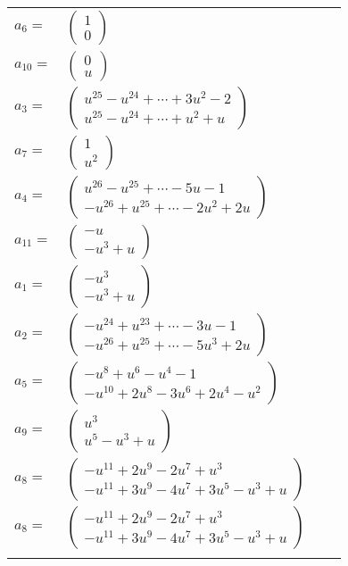\documentclass[1p]{elsarticle_modified}
\theoremstyle{definition}
\begin{document}
\begin{tabular}{m{7pt} m{180pt} m{7pt} m{180pt} }
\flushright $a_{6}=$&$\begin{pmatrix}1\\0\end{pmatrix}$ \\
\flushright $a_{10}=$&$\begin{pmatrix}0\\u\end{pmatrix}$ \\
\flushright $a_{3}=$&$\begin{pmatrix}u^{25}- u^{24}+\cdots+3 u^2-2\\u^{25}- u^{24}+\cdots+u^2+u\end{pmatrix}$ \\
\flushright $a_{7}=$&$\begin{pmatrix}1\\u^2\end{pmatrix}$ \\
\flushright $a_{4}=$&$\begin{pmatrix}u^{26}- u^{25}+\cdots-5 u-1\\- u^{26}+u^{25}+\cdots-2 u^2+2 u\end{pmatrix}$ \\
\flushright $a_{11}=$&$\begin{pmatrix}- u\\- u^3+u\end{pmatrix}$ \\
\flushright $a_{1}=$&$\begin{pmatrix}- u^3\\- u^3+u\end{pmatrix}$ \\
\flushright $a_{2}=$&$\begin{pmatrix}- u^{24}+u^{23}+\cdots-3 u-1\\- u^{26}+u^{25}+\cdots-5 u^3+2 u\end{pmatrix}$ \\
\flushright $a_{5}=$&$\begin{pmatrix}- u^8+u^6- u^4-1\\- u^{10}+2 u^8-3 u^6+2 u^4- u^2\end{pmatrix}$ \\
\flushright $a_{9}=$&$\begin{pmatrix}u^3\\u^5- u^3+u\end{pmatrix}$ \\
\flushright $a_{8}=$&$\begin{pmatrix}- u^{11}+2 u^9-2 u^7+u^3\\- u^{11}+3 u^9-4 u^7+3 u^5- u^3+u\end{pmatrix}$\\ \flushright $a_{8}=$&$\begin{pmatrix}- u^{11}+2 u^9-2 u^7+u^3\\- u^{11}+3 u^9-4 u^7+3 u^5- u^3+u\end{pmatrix}$\\&\end{tabular}
\end{document}
